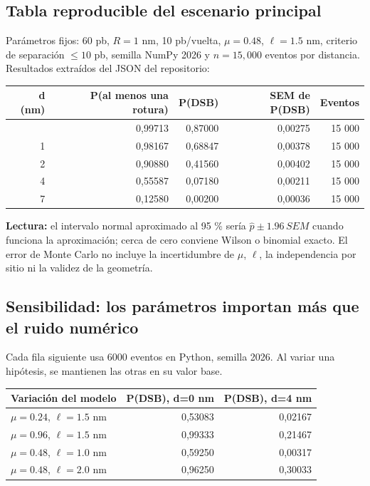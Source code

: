 \documentclass[11pt,a4paper,oneside]{article}
\begin{document}
\subsection{Tabla reproducible del escenario principal}\label{tabla-reproducible-del-escenario-principal}

Parámetros fijos: 60 pb, \(R=1\) nm, 10 pb/vuelta, \(\mu=0.48\), \(\ell=1.5\) nm, criterio de separación \(\leq10\) pb, semilla NumPy 2026 y \(n=15,000\) eventos por distancia. Resultados extraídos del JSON del repositorio:

\begin{longtable}[]{@{}rrrrr@{}}
\toprule\noalign{}
d (nm) & P(al menos una rotura) & P(DSB) & SEM de P(DSB) & Eventos \\
\midrule\noalign{}
\endhead
\bottomrule\noalign{}
\endlastfoot
0 & 0,99713 & 0,87000 & 0,00275 & 15 000 \\
1 & 0,98167 & 0,68847 & 0,00378 & 15 000 \\
2 & 0,90880 & 0,41560 & 0,00402 & 15 000 \\
4 & 0,55587 & 0,07180 & 0,00211 & 15 000 \\
7 & 0,12580 & 0,00200 & 0,00036 & 15 000 \\
\end{longtable}

\textbf{Lectura:} el intervalo normal aproximado al 95 \% sería \(\widehat p\pm1.96\,SEM\) cuando funciona la aproximación; cerca de cero conviene Wilson o binomial exacto. El error de Monte Carlo no incluye la incertidumbre de \(\mu\), \(\ell\), la independencia por sitio ni la validez de la geometría.

\subsection{Sensibilidad: los parámetros importan más que el ruido numérico}\label{sensibilidad-los-paruxe1metros-importan-muxe1s-que-el-ruido-numuxe9rico}

Cada fila siguiente usa 6000 eventos en Python, semilla 2026. Al variar una hipótesis, se mantienen las otras en su valor base.

\begin{longtable}[]{@{}lrr@{}}
\toprule\noalign{}
Variación del modelo & P(DSB), d=0 nm & P(DSB), d=4 nm \\
\midrule\noalign{}
\endhead
\bottomrule\noalign{}
\endlastfoot
\(\mu=0.24\), \(\ell=1.5\) nm & 0,53083 & 0,02167 \\
\(\mu=0.96\), \(\ell=1.5\) nm & 0,99333 & 0,21467 \\
\(\mu=0.48\), \(\ell=1.0\) nm & 0,59250 & 0,00317 \\
\(\mu=0.48\), \(\ell=2.0\) nm & 0,96250 & 0,30033 \\
\end{longtable}
\end{document}
